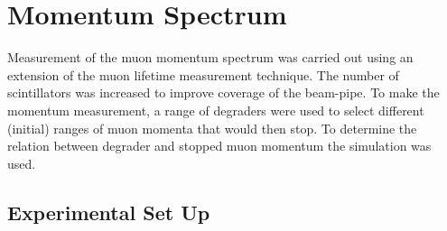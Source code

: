 
\clearpage
\section{Momentum Spectrum} %
\label{cha:momentum_spectrum}
Measurement of the muon momentum spectrum was carried out using an extension of the muon lifetime measurement technique. The number of scintillators was increased to improve coverage of the beam-pipe. To make the momentum measurement, a range of degraders were used to select different (initial) ranges of muon momenta that would then stop. To determine the relation between degrader and stopped muon momentum the simulation was used.


\subsection{Experimental Set Up} %
\label{sec:experimental_set_up}
